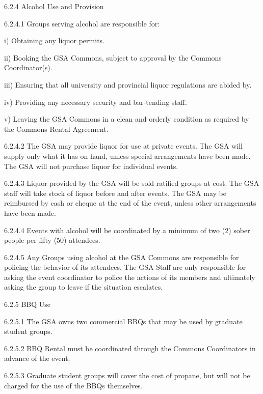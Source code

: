  
 
 6.2.4 Alcohol Use and Provision 
 
 
 
 6.2.4.1 Groups serving alcohol are responsible for: 
 
 
 
 i) Obtaining any liquor permits. 
 
 
 
 ii) Booking the GSA Commons, subject to approval by the Commons 
 Coordinator(s). 
 
 
 
 iii) Ensuring that all university and provincial liquor regulations are 
 abided by. 
 
 iv) Providing any necessary security and bar-tending staff. 
 
 
 
 v) Leaving the GSA Commons in a clean and orderly condition as 
 required by the Commons Rental Agreement. 
 
 
 
 6.2.4.2 The GSA may provide liquor for use at private events. The GSA 
 will supply only what it has on hand, unless special arrangements 
 have been made. The GSA will not purchase liquor for individual 
 events. 
 
 6.2.4.3 Liquor provided by the GSA will be sold ratified groups at cost. The 
 GSA staff will take stock of liquor before and after events. The 
 GSA may be reimbursed by cash or cheque at the end of the event, 
 unless other arrangements have been made. 
 
 6.2.4.4 Events with alcohol will be coordinated by a minimum of two (2) 
 sober people per fifty (50) attendees. 
 
 6.2.4.5 Any Groups using alcohol at the GSA Commons are responsible for 
 policing the behavior of its attendees. The GSA Staff are only 
 responsible for asking the event coordinator to police the actions of 
 its members and ultimately asking the group to leave if the situation 
 escalates. 
 
 
 6.2.5 BBQ Use 
 
 6.2.5.1 The GSA owns two commercial BBQs that may be used by 
 graduate student groups. 
 
 6.2.5.2 BBQ Rental must be coordinated through the Commons 
 Coordinators in advance of the event. 
 
 6.2.5.3 Graduate student groups will cover the cost of propane, but will not 
 be charged for the use of the BBQs themselves. 
 
